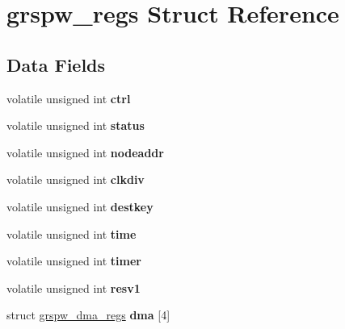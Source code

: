 \hypertarget{structgrspw__regs}{}\section{grspw\+\_\+regs Struct Reference}
\label{structgrspw__regs}
\subsection*{Data Fields}
\begin{DoxyCompactItemize}
\item 
\mbox{\label{structgrspw__regs_a1519af4af8b7ba92c46283e06ea23cec}} 
volatile unsigned int {\bfseries ctrl}
\item 
\mbox{\label{structgrspw__regs_a12ffe271424f6f65c67265759dea9cd7}} 
volatile unsigned int {\bfseries status}
\item 
\mbox{\label{structgrspw__regs_a52862ffa90de75fff02770c7668d9350}} 
volatile unsigned int {\bfseries nodeaddr}
\item 
\mbox{\label{structgrspw__regs_a9307bea7349bdce70fa802447882bb7b}} 
volatile unsigned int {\bfseries clkdiv}
\item 
\mbox{\label{structgrspw__regs_a16f690570e94df51d0bc09680a57db1a}} 
volatile unsigned int {\bfseries destkey}
\item 
\mbox{\label{structgrspw__regs_aebafe3ea1abaad2aaf794d7a152cfc42}} 
volatile unsigned int {\bfseries time}
\item 
\mbox{\label{structgrspw__regs_ab0992b91af1e51a3e4eff5eb354000c0}} 
volatile unsigned int {\bfseries timer}
\item 
\mbox{\label{structgrspw__regs_a4326eab7b1e21f07ccf017e7e80533e9}} 
volatile unsigned int {\bfseries resv1}
\item 
\mbox{\label{structgrspw__regs_a4948c697f2d3475d8d2f844e7038ab93}} 
struct \mbox{\hyperlink{structgrspw__dma__regs}{grspw\+\_\+dma\+\_\+regs}} {\bfseries dma} \mbox{[}4\mbox{]}

\end{DoxyCompactItemize}

